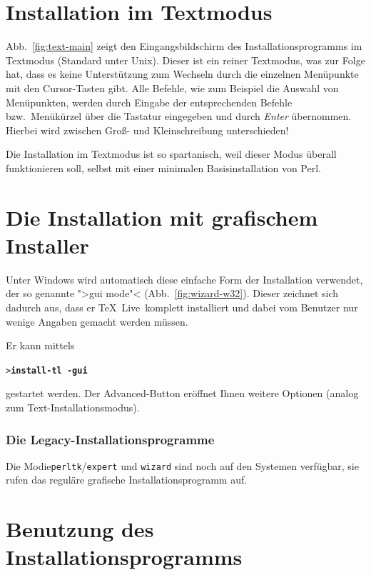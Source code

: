 \documentclass[12pt,ngerman,a4paper,fullparskip]{scrreprt}
\newcommand{\TL}{\TeX\ Live\xspace}
\newcommand{\Ucom}[1]{\textbf{\texttt{#1}}}
\begin{document}
\section{Installation im Textmodus}

Abb.~\ref{fig:text-main} zeigt den Eingangsbildschirm des Installationsprogramms im Textmodus (Standard unter Unix). Dieser ist ein reiner Textmodus, was zur Folge hat, dass es keine Unterstützung zum Wechseln durch die einzelnen Menüpunkte mit den Cursor-Tasten gibt. Alle Befehle, wie zum Beispiel die Auswahl von Menüpunkten, werden durch Eingabe der entsprechenden Befehle bzw.\ Menükürzel über die Tastatur eingegeben und durch \emph{Enter} übernommen. Hierbei wird zwischen Groß- und Kleinschreibung unterschieden!

Die Installation im Textmodus ist so spartanisch, weil dieser Modus überall funktionieren soll, selbst mit einer minimalen Basisinstallation von Perl.

\section{Die Installation mit grafischem Installer}

Unter Windows wird automatisch diese einfache Form der Installation verwendet,
der so genannte ">gui mode"< (Abb.~\ref{fig:wizard-w32}). Dieser zeichnet sich dadurch aus, dass er \TL\ komplett installiert und dabei vom Benutzer nur wenige Angaben gemacht werden müssen. 

Er kann mittels 

\begin{alltt}
> \Ucom{install-tl -gui}
\end{alltt}

gestartet werden.  Der Advanced-Button eröffnet Ihnen weitere Optionen (analog zum Text-Installationsmodus). %

\subsubsection{Die Legacy-Installationsprogramme}

Die Modie\texttt{perltk}/\texttt{expert} und \texttt{wizard} sind noch auf den Systemen verfügbar, sie rufen das reguläre grafische Installationsprogramm auf.

\section{Benutzung des Installationsprogramms}\label{sec:runinstall}
\end{document}
